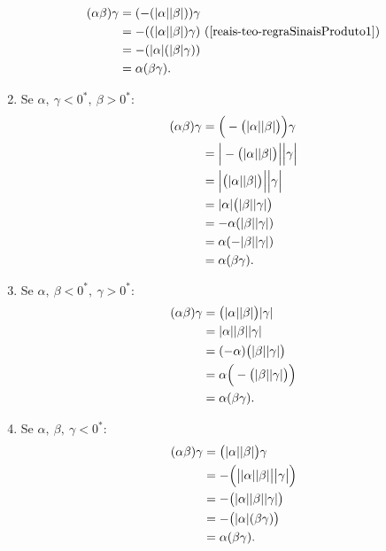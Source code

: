 \documentclass[../main.tex]{subfiles}
\begin{document}
\begin{dem}
\begin{enumerate}
\begin{align*}
                 (\alpha\beta)\gamma 
                 &= (-(\abs{\alpha}\abs{\beta}))\gamma \\
                 &= -((\abs{\alpha}\abs{\beta})\gamma) \text{ (\Cref{reais-teo-regraSinaisProduto1})} \\
                 &= -(\abs{\alpha}(\abs{\beta}\gamma)) \\
                 &= \alpha(\beta\gamma).
            \end{align*}
        \item Se $\alpha,\ \gamma < 0^*,\ \beta > 0^*$:
            \begin{align*}
                (\alpha\beta)\gamma
                &= \Big( -\big(\abs{\alpha}\abs{\beta} \big) \Big)\gamma \\
                &= \Big| -\big( \abs{\alpha} \abs{\beta} \big) \Big| \Big| \gamma \Big| \\
                &= \Big| \big( \abs{\alpha} \abs{\beta} \big) \Big| \Big| \gamma \Big| \\ 
                &= \abs{\alpha} \big( \abs{\beta} \abs{\gamma} \big) \\
                &= -\alpha (\abs{\beta}\abs{\gamma}) \\
                &= \alpha(-\abs{\beta}\abs{\gamma}) \\
                &= \alpha (\beta\gamma).               
            \end{align*}       
        \item Se $\alpha,\ \beta < 0^*,\ \gamma > 0^*$:
            \begin{align*}
                (\alpha\beta)\gamma
                &= \big( \abs{\alpha} \abs{\beta} \big) \abs{\gamma} \\
                &= \abs{\alpha}  \abs{\beta} \abs{\gamma} \\
                &= (-\alpha)\big(\abs{\beta}\abs{\gamma}\big) \\
                &= \alpha \Big( - \big( \abs{\beta} \abs{\gamma} \big) \Big) \\
                &= \alpha(\beta\gamma).
            \end{align*}  
        \item Se $\alpha,\ \beta,\ \gamma < 0^* $:
            \begin{align*}
                (\alpha\beta)\gamma 
                &= \big(\abs{\alpha}\abs{\beta}\big)\gamma \\
                &= -\Big(\big|\abs{\alpha}\abs{\beta}\big|\big|\gamma\big|\Big) \\
                &= -\big(\abs{\alpha}\abs{\beta}\abs{\gamma}\big) \\
                &= -\big( \abs{\alpha} (\beta\gamma) \big) \\
                &= \alpha(\beta\gamma).
            \end{align*}
    \end{enumerate}
\end{dem}
\end{document}
